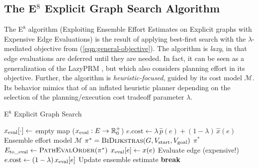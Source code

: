 \subsection{The E$^8$ Explicit Graph Search Algorithm}
\label{sec:e8-planner}

The E$^8$ algorithm
(Exploiting Ensemble Effort Estimates
on Explicit graphs with Expensive Edge Evaluations)
is the result of applying
best-first search with the $\lambda$-mediated objective
from (\ref{eqn:general-objective}).
The algorithm is \emph{lazy},
in that edge evaluations are deferred until they are needed.
In fact, it can be seen as a generalization of the
LazyPRM \citep{bohlin2000lazyprm},
but which also considers planning effort in its objective.
Further,
the algorithm is \emph{heuristic-focused},
guided by its cost model $\mathcal{M}$.
Its behavior mimics that of an inflated heuristic planner
depending on the selection of the planning/execution cost
tradeoff parameter $\lambda$.

\begin{algorithm}[t]
\caption{E$^8$ Explicit Graph Search}
\label{alg:e8}
\begin{algorithmic}[1]
   \State $x_{\mbox{\scriptsize eval}}[\cdot] \leftarrow$ empty map
      ($x_{\mbox{\scriptsize eval}} : E \rightarrow \mathbb{R}_0^+$)
      \label{line:store-edge-eval-efforts}
      \State $e.{\mbox{cost}} \leftarrow
         \lambda \, \hat{p}(e) + (1 - \lambda) \, \hat{x}(e)$
         \Comment Ensemble effort model $\mathcal{M}$
         \label{line:edge-cost}
   \EndFor
   \Loop
         \label{line:best-first-start}
      \State $\pi^* = \mbox{\sc BiDijkstras}(G,
         V_{\mbox{\scriptsize start}}, V_{\mbox{\scriptsize goal}})$
         \label{line:e8-select-optimistic-path}
         \State \Return $\pi^*$
            \label{line:return-done}
      \EndIf
      \State $E_{\mbox{\scriptsize to\_eval}} \leftarrow
         \mbox{\sc PathEvalOrder}(\pi^*)$
         \label{line:path-eval-order}
         \State $x_{\mbox{\scriptsize eval}}[e] \leftarrow x(e)$
            \Comment Evaluate edge (expensive!)
            \label{line:evaulate-edge}
         \State $e.{\mbox{cost}} \leftarrow
            (1 - \lambda) \, x_{\mbox{\scriptsize eval}}[e]$
            \Comment Update ensemble estimate
            \label{line:update-estimate}
            \label{line:exec-cost-check}
            \State \textbf{break}
               \label{line:eval-break}
         \EndIf
      \EndFor
   \EndLoop
      \label{line:best-first-end}
   \EndProcedure
\end{algorithmic}
\end{algorithm}

